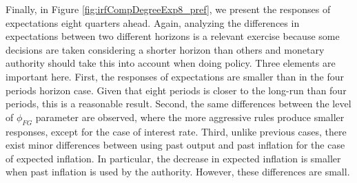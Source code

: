 \documentclass[11pt]{article}
\numberwithin{equation}{section}
\begin{document}
Finally, in Figure \ref{fig:irfCompDegreeExp8_pref}, we present the responses of expectations eight quarters ahead. Again, analyzing the differences in expectations between two different horizons is a relevant exercise because some decisions are taken considering a shorter horizon than others and monetary authority should take this into account when doing policy. Three elements are important here. First, the responses of expectations are smaller than in the four periods horizon case. Given that eight periods is closer to the long-run than four periods, this is a reasonable result. Second, the same differences between the level of $\phi_{FG}$ parameter are observed, where the more aggressive rules produce smaller responses, except for the case of interest rate. Third, unlike previous cases, there exist minor differences between using past output and past inflation for the case of expected inflation. In particular, the decrease in expected inflation is smaller when past inflation is used by the authority. However, these differences are small.
\end{document}
